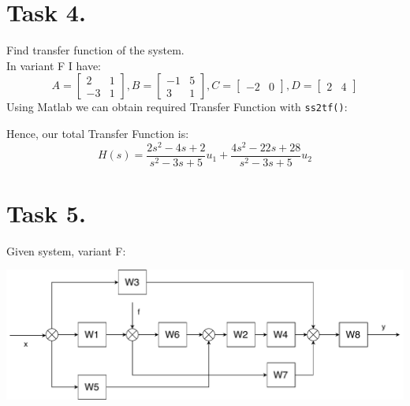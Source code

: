\documentclass[a4paper,12pt]{article}
\begin{document}
\section{Task 4.}
    Find transfer function of the system.\\
    In variant F I have:
    \begin{equation*}
        A = \begin{bmatrix}
             2 & 1\\
             -3 & 1
        \end{bmatrix},
        B = \begin{bmatrix}
            -1 & 5 \\ 
            3 & 1
        \end{bmatrix},
        C = \begin{bmatrix}
            -2 & 0
        \end{bmatrix},
        D = \begin{bmatrix}
            2 & 4
        \end{bmatrix}
    \end{equation*}
    Using Matlab we can obtain required Transfer Function with \texttt{ss2tf()}:
    
    Hence, our total Transfer Function is:
    \begin{equation*}
        H(s) = \frac{2s^2 - 4s + 2}{s^2 - 3 s + 5}  u_1 + 
        \frac{4 s^2 - 22 s + 28}{s^2 - 3 s + 5} u_2
    \end{equation*}
\newpage
\section{Task 5.}
    Given system, variant F:
    \begin{center}
        \includegraphics[width=\linewidth]{../Task5/T5Source.pdf}
    \end{center}
\end{document}
